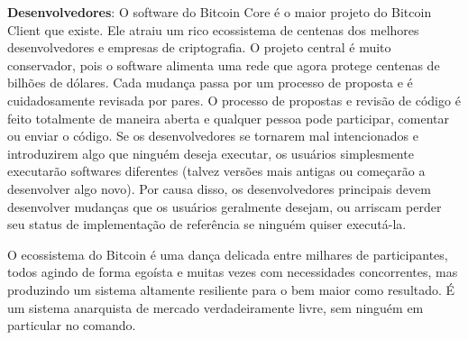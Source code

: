\textbf{Desenvolvedores}: O software do Bitcoin Core é o maior projeto do Bitcoin Client que existe. Ele atraiu um rico ecossistema de centenas dos melhores desenvolvedores e empresas de criptografia. O projeto central é muito conservador, pois o software alimenta uma rede que agora protege centenas de bilhões de dólares. Cada mudança passa por um processo de proposta e é cuidadosamente revisada por pares. O processo de propostas e revisão de código é feito totalmente de maneira aberta e qualquer pessoa pode participar, comentar ou enviar o código. Se os desenvolvedores se tornarem mal intencionados e introduzirem algo que ninguém deseja executar, os usuários simplesmente executarão softwares diferentes (talvez versões mais antigas ou começarão a desenvolver algo novo). Por causa disso, os desenvolvedores principais devem desenvolver mudanças que os usuários geralmente desejam, ou arriscam perder seu status de implementação de referência se ninguém quiser executá-la.

O ecossistema do Bitcoin é uma dança delicada entre milhares de participantes, todos agindo de forma egoísta e muitas vezes com necessidades concorrentes, mas produzindo um sistema altamente resiliente para o bem maior como resultado. É um sistema anarquista de mercado verdadeiramente livre, sem ninguém em particular no comando.